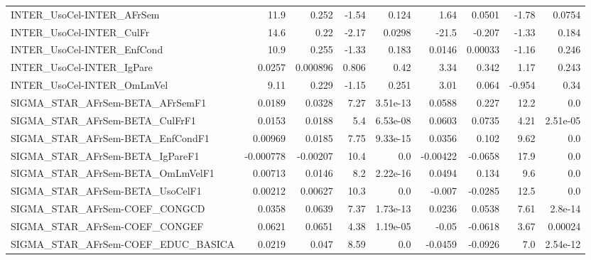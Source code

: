 \begin{tabular}{lrrrrrrrr}
INTER\_UsoCel-INTER\_AFrSem             &        11.9 &        0.252 &    -1.54 &    0.124 &       1.64 &      0.0501 &        -1.78 &        0.0754 \\
INTER\_UsoCel-INTER\_CulFr              &        14.6 &         0.22 &    -2.17 &   0.0298 &      -21.5 &      -0.207 &        -1.33 &         0.184 \\
INTER\_UsoCel-INTER\_EnfCond            &        10.9 &        0.255 &    -1.33 &    0.183 &     0.0146 &     0.00033 &        -1.16 &         0.246 \\
INTER\_UsoCel-INTER\_IgPare             &      0.0257 &     0.000896 &    0.806 &     0.42 &       3.34 &       0.342 &         1.17 &         0.243 \\
INTER\_UsoCel-INTER\_OmLmVel            &        9.11 &        0.229 &    -1.15 &    0.251 &       3.01 &       0.064 &       -0.954 &          0.34 \\
SIGMA\_STAR\_AFrSem-BETA\_AFrSemF1       &      0.0189 &       0.0328 &     7.27 & 3.51e-13 &     0.0588 &       0.227 &         12.2 &           0.0 \\
SIGMA\_STAR\_AFrSem-BETA\_CulFrF1        &      0.0153 &       0.0188 &      5.4 & 6.53e-08 &     0.0603 &      0.0735 &         4.21 &      2.51e-05 \\
SIGMA\_STAR\_AFrSem-BETA\_EnfCondF1      &     0.00969 &       0.0185 &     7.75 & 9.33e-15 &     0.0356 &       0.102 &         9.62 &           0.0 \\
SIGMA\_STAR\_AFrSem-BETA\_IgPareF1       &   -0.000778 &     -0.00207 &     10.4 &      0.0 &   -0.00422 &     -0.0658 &         17.9 &           0.0 \\
SIGMA\_STAR\_AFrSem-BETA\_OmLmVelF1      &     0.00713 &       0.0146 &      8.2 & 2.22e-16 &     0.0494 &       0.134 &          9.6 &           0.0 \\
SIGMA\_STAR\_AFrSem-BETA\_UsoCelF1       &     0.00212 &      0.00627 &     10.3 &      0.0 &     -0.007 &     -0.0285 &         12.5 &           0.0 \\
SIGMA\_STAR\_AFrSem-COEF\_CONGCD         &      0.0358 &       0.0639 &     7.37 & 1.73e-13 &     0.0236 &      0.0538 &         7.61 &       2.8e-14 \\
SIGMA\_STAR\_AFrSem-COEF\_CONGEF         &      0.0621 &       0.0651 &     4.38 & 1.19e-05 &      -0.05 &     -0.0618 &         3.67 &       0.00024 \\
SIGMA\_STAR\_AFrSem-COEF\_EDUC\_BASICA    &      0.0219 &        0.047 &     8.59 &      0.0 &    -0.0459 &     -0.0926 &          7.0 &      2.54e-12 \\

\end{tabular}
